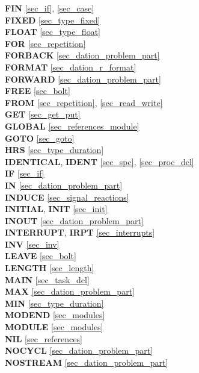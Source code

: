 {{\bf FIN} \ref{sec_if}, \ref{sec_case}\\
{\bf FIXED} \ref{sec_type_fixed}\\
{\bf FLOAT} \ref{sec_type_float}\\
{\bf FOR} \ref{sec_repetition}\\
{\bf FORBACK} \ref{sec_dation_problem_part}\\
{\bf FORMAT} \ref{sec_dation_r_format}\\
{\bf FORWARD} \ref{sec_dation_problem_part}\\
{\bf FREE} \ref{sec_bolt}\\
{\bf FROM} \ref{sec_repetition}, \ref{sec_read_write}\\
 
{\bf GET} \ref{sec_get_put}\\
{\bf GLOBAL} \ref{sec_references_module}\\
{\bf GOTO} \ref{sec_goto}\\
 
{\bf HRS} \ref{sec_type_duration}\\
 
{\bf IDENTICAL}, {\bf IDENT} \ref{sec_spc}, \ref{sec_proc_dcl}\\
{\bf IF} \ref{sec_if}\\                           
{\bf IN} \ref{sec_dation_problem_part}\\
{\bf INDUCE} \ref{sec_signal_reactions}\\
{\bf INITIAL}, {\bf INIT} \ref{sec_init}\\
{\bf INOUT} \ref{sec_dation_problem_part}\\
{\bf INTERRUPT}, {\bf IRPT} \ref{sec_interrupts}\\
{\bf INV} \ref{sec_inv}\\
 
{\bf LEAVE} \ref{sec_bolt}\\
{\bf LENGTH} \ref{sec_length}\\
 
{\bf MAIN} \ref{sec_task_dcl}\\
{\bf MAX} \ref{sec_dation_problem_part}\\
{\bf MIN} \ref{sec_type_duration}\\
{\bf MODEND} \ref{sec_modules}\\
{\bf MODULE} \ref{sec_modules}\\
 
{\bf NIL} \ref{sec_references}\\
{\bf NOCYCL} \ref{sec_dation_problem_part}\\
{\bf NOSTREAM} \ref{sec_dation_problem_part}\\

}
